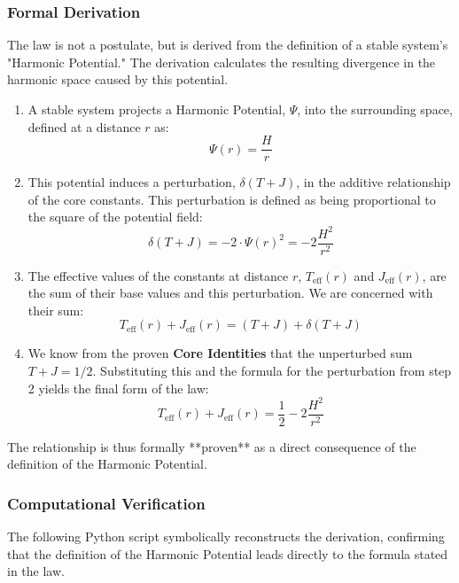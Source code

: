 \subsubsection*{Formal Derivation}
The law is not a postulate, but is derived from the definition of a stable system's "Harmonic Potential." The derivation calculates the resulting divergence in the harmonic space caused by this potential.

\begin{enumerate}
    \item A stable system projects a Harmonic Potential, $\Psi$, into the surrounding space, defined at a distance $r$ as:
    $$ \Psi(r) = \frac{H}{r} $$

    \item This potential induces a perturbation, $\delta(T+J)$, in the additive relationship of the core constants. This perturbation is defined as being proportional to the square of the potential field:
    $$ \delta(T+J) = -2 \cdot \Psi(r)^2 = -2\frac{H^2}{r^2} $$

    \item The effective values of the constants at distance $r$, $T_{\text{eff}}(r)$ and $J_{\text{eff}}(r)$, are the sum of their base values and this perturbation. We are concerned with their sum:
    $$ T_{\text{eff}}(r) + J_{\text{eff}}(r) = (T+J) + \delta(T+J) $$

    \item We know from the proven \textbf{Core Identities} that the unperturbed sum $T+J = 1/2$. Substituting this and the formula for the perturbation from step 2 yields the final form of the law:
    $$ T_{\text{eff}}(r) + J_{\text{eff}}(r) = \frac{1}{2} - 2\frac{H^2}{r^2} $$
\end{enumerate}
The relationship is thus formally **proven** as a direct consequence of the definition of the Harmonic Potential.

\subsubsection*{Computational Verification}
The following Python script symbolically reconstructs the derivation, confirming that the definition of the Harmonic Potential leads directly to the formula stated in the law.


